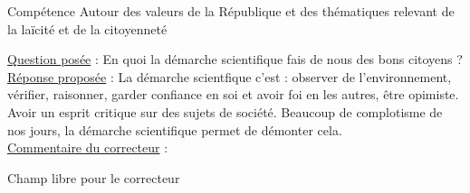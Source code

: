 \begin{reportBlock}{Compétence \og Autour des valeurs de la République et des thématiques relevant de la laïcité et de la citoyenneté \fg{}}

\underline{Question posée} : En quoi la démarche scientifique fais de nous des bons citoyens ? \\

\underline{Réponse proposée} : La démarche scientfique c'est : observer de l'environnement, vérifier, raisonner, garder confiance en soi et avoir foi en les autres, être opimiste. Avoir un esprit critique sur des sujets de société. Beaucoup de complotisme de nos jours, la démarche scientifique permet de démonter cela.\\

\underline{Commentaire du correcteur} : 

\end{reportBlock}


\begin{reportBlock}{Champ libre pour le correcteur}

\end{reportBlock}
